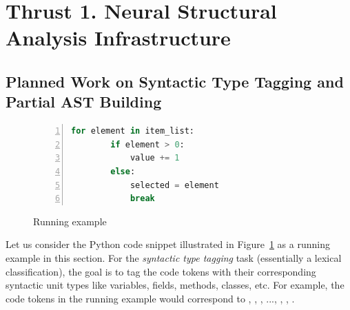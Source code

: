 \section{Thrust 1. Neural Structural Analysis Infrastructure}
\label{sec:thrust1}

\subsection{Planned Work on Syntactic Type Tagging and Partial AST Building}

\begin{figure}
\begin{lstlisting}[basicstyle=\scriptsize\sffamily, stepnumber=1, numbers=left, numbersep=-6pt, framexleftmargin=0mm, framexrightmargin=0mm, language=Python, emph ={}]
    for element in item_list:
        if element > 0:
            value += 1
        else:
            selected = element
            break
\end{lstlisting}
\vspace{-0.1in}
\caption{Running example}
\label{run_ex}
\end{figure}

Let us consider the Python code snippet illustrated in Figure~\ref{run_ex} as a running example in this section. For the {\em syntactic type tagging} task (essentially a lexical classification), the goal is to tag the code tokens with their corresponding syntactic unit types like variables, fields, methods, classes, etc. For example, the code tokens in the running example would correspond to , , , ..., \code{=}, , . 

